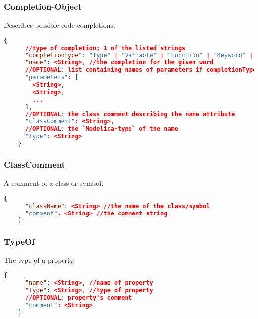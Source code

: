   \subsubsection{Completion-Object}
  Describes possible code completions.
  \newline{}
  \begin{lstlisting}[basicstyle=\small,language=json]
    {
      //type of completion; 1 of the listed strings
      "completionType": "Type" | "Variable" | "Function" | "Keyword" | "Package" | "Model" | "Class",
      "name": <String>, //the completion for the given word
      //OPTIONAL: list containing names of parameters if completionType=function
      "parameters": [
        <String>,
        <String>,
        ...
      ],
      //OPTIONAL: the class comment describing the name attribute
      "classComment": <String>,
      //OPTIONAL: the `Modelica-type` of the name
      "type": <String>
    }
  \end{lstlisting}

  \subsubsection{ClassComment}
  A comment of a class or symbol.
  \newline{}
  \begin{lstlisting}[basicstyle=\small,language=json]
    {
      "className": <String> //the name of the class/symbol
      "comment": <String> //the comment string
    }
  \end{lstlisting}

  \subsubsection{TypeOf}
  The type of a property.
  \newline{}
  \begin{lstlisting}[basicstyle=\small,language=json]
    {
      "name": <String>, //name of property
      "type": <String>, //type of property
      //OPTIONAL: property's comment
      "comment": <String>
    }
  \end{lstlisting}
